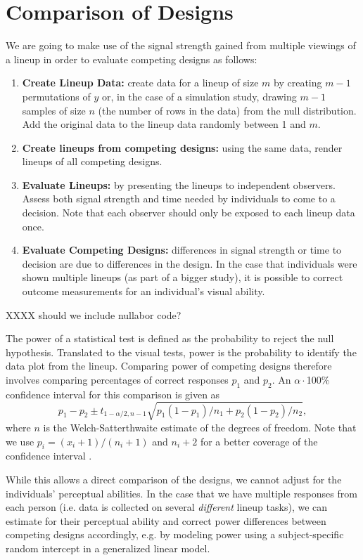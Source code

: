 \section{Comparison of Designs}\label{designs}
We are going to make use of the signal strength gained from multiple viewings of a lineup in order to evaluate competing designs as follows:
\begin{enumerate}
\item{{\bf Create Lineup Data:} create data for a lineup of size $m$ by  creating  $m-1$ permutations of $y$ or, in the case of a simulation study, drawing $m-1$ samples of size $n$ (the number of rows in the data) from the null distribution. Add the original data to the lineup data randomly between 1 and $m$. }
\item{{\bf Create lineups from competing designs:} using the same data, render lineups of all competing designs. }
\item{{\bf Evaluate Lineups:} by presenting the lineups to independent observers. Assess both signal strength and time needed by individuals to come to a decision. Note that each observer should only be exposed to each lineup data once.}
\item{{\bf Evaluate Competing Designs:} differences in signal strength or time to decision are due to differences in the design. In the case that individuals were shown multiple lineups (as part of a bigger study), it is possible to correct outcome measurements for an individual's visual ability. }
\end{enumerate}

XXXX should we include nullabor code?

The power of a statistical test is defined as the probability to reject the null hypothesis. Translated to the visual tests, power is the probability to identify the data plot from the lineup. 
Comparing power of competing designs therefore involves comparing percentages of correct responses $p_1$ and $p_2$. An $\alpha\cdot$100\% confidence interval for this comparison is given as 
\[
p_1 - p_2 \pm t_{1-\alpha/2, n-1} \sqrt{p_1(1-p_1)/n_1 + p_2(1-p_2)/n_2},
\]
where $n$ is the Welch-Satterthwaite \cite{welch:1947} estimate of the degrees of freedom. Note that we use $p_i = (x_i+1)/(n_i+1)$ and $n_i+2$ for a better coverage of the confidence interval \cite{agresti:1998}.

While this allows a direct comparison of the designs, we cannot adjust for the individuals' perceptual abilities.
In the case that we have multiple responses from each person (i.e. data is collected on several {\it different} lineup tasks), we can estimate for their perceptual ability and correct power differences between competing designs accordingly, e.g. by modeling power using  a subject-specific random intercept in a generalized linear model.




